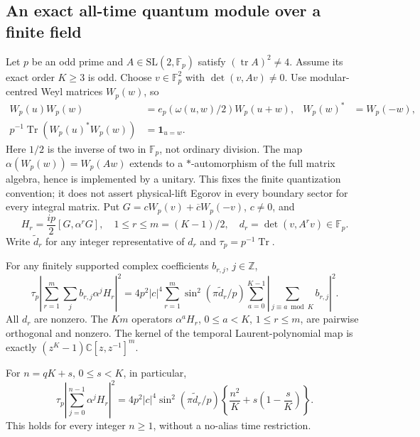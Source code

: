 \subsection{An exact all-time quantum module over a finite field}
Let $p$ be an odd prime and $A\in\mathrm{SL}(2,\mathbb F_p)$ satisfy
$(\operatorname{tr}A)^2\ne4$. Assume its exact order $K\ge3$ is odd.
Choose $v\in\mathbb F_p^2$ with $\det(v,Av)\ne0$.
Use modular-centred Weyl matrices $W_p(w)$, so
\begin{align*}
 W_p(u)W_p(w)&=e_p(\omega(u,w)/2)W_p(u+w),&
 W_p(w)^*&=W_p(-w),\\
 p^{-1}\operatorname{Tr}(W_p(u)^*W_p(w))&=\mathbf1_{u=w}.
\end{align*}
Here $1/2$ is the inverse of two in $\mathbb F_p$, not ordinary division.
The map $\alpha(W_p(w))=W_p(Aw)$ extends to a $*$-automorphism of the full
matrix algebra, hence is implemented by a unitary. This fixes the finite
quantization convention; it does not assert physical-lift Egorov in every
boundary sector for every integral matrix.
Put $G=cW_p(v)+\overline cW_p(-v)$, $c\ne0$, and
\[
 H_r=\frac{ip}{2}[G,\alpha^rG],\quad
 1\le r\le m=(K-1)/2,\quad d_r=\det(v,A^rv)\in\mathbb F_p.
\]
Write $\widetilde d_r$ for any integer representative of $d_r$ and
$\tau_p=p^{-1}\operatorname{Tr}$.
\begin{theorem}
\label{thm:quantum-cycles}
For any finitely supported complex coefficients $b_{r,j}$, $j\in\mathbb Z$,
\begin{equation}\label{eq:quantum-cyclic-module}
 \tau_p\left|\sum_{r=1}^m\sum_j b_{r,j}\alpha^jH_r\right|^2
 =4p^2|c|^4\sum_{r=1}^m\sin^2(\pi\widetilde d_r/p)
       \sum_{a=0}^{K-1}\left|\sum_{j\equiv a\bmod K}b_{r,j}\right|^2.
\end{equation}
All $d_r$ are nonzero. The $Km$ operators
$\alpha^aH_r$, $0\le a<K$, $1\le r\le m$, are pairwise orthogonal and
nonzero. The kernel of the temporal Laurent-polynomial map is exactly
$(z^K-1)\mathbb C[z,z^{-1}]^m$.

For $n=qK+s$, $0\le s<K$, in particular,
\begin{equation}\label{eq:quantum-all-time}
 \tau_p\left|\sum_{j=0}^{n-1}\alpha^jH_r\right|^2
 =4p^2|c|^4\sin^2(\pi\widetilde d_r/p)
       \left\{\frac{n^2}{K}+s\left(1-\frac{s}{K}\right)\right\}.
\end{equation}
This holds for every integer $n\ge1$, without a no-alias time restriction.
\end{theorem}
